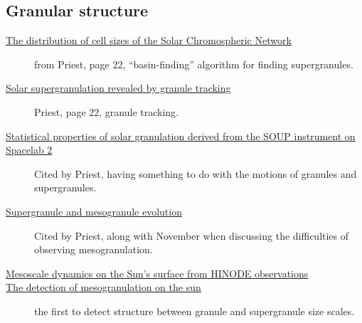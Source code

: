 \documentclass{article}
\begin{document}
\subsection{Granular structure}
\begin{description}
    \item [\href{http://cdsads.u-strasbg.fr/abs/1997ApJ...481..988H}
        {The distribution of cell sizes of the Solar Chromospheric Network}]
        from Priest, page 22, ``basin-finding'' algorithm for finding
        supergranules.
    \item [\href{http://cdsads.u-strasbg.fr/abs/2008A\%26A...479L..17R}
        {Solar supergranulation revealed by granule tracking}]
        Priest, page 22, granule tracking.
    \item [\href{http://cdsads.u-strasbg.fr/abs/1989ApJ...336..475T}
        {Statistical properties of solar granulation derived
        from the SOUP instrument on Spacelab 2}]
        Cited by Priest, having something to do with the motions of granules and supergranules.
    \item [\href{http://cdsads.u-strasbg.fr/abs/2000SoPh..193..313S}
        {Supergranule and mesogranule evolution}]
        Cited by Priest, along with November when
        discussing the difficulties of observing mesogranulation.
    \item [\href{http://adsabs.harvard.edu/cgi-bin/bib_query?arXiv:0902.2299}
        {Mesoscale dynamics on the Sun's surface from HINODE
        observations}]
    \item [\href{http://adsabs.harvard.edu/abs/1981ApJ...245L.123N}
        {The detection of mesogranulation on the sun}]
        the first to detect structure between granule
        and supergranule size scales.
\end{description}
\end{document}
